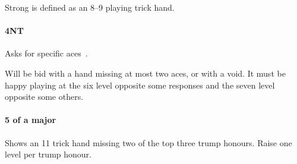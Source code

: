 Strong is defined as an 8--9 playing trick hand.

\paragraph{4NT}

Asks for specific aces~.

Will be bid with a hand missing at most two aces, or with a void. It must be happy playing at the six level opposite some responses and the seven level opposite some others.

\paragraph{5 of a major}

Shows an 11 trick hand missing two of the top three trump honours. Raise one level per trump honour.


